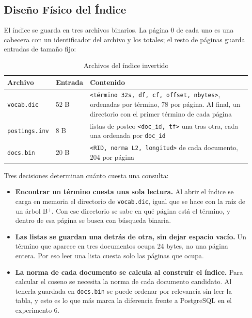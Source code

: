 \documentclass[a4paper,12pt]{article}
\begin{document}
\subsection{Diseño Físico del Índice}

El índice se guarda en tres archivos binarios. La página 0 de cada uno es una
cabecera con un identificador del archivo y los totales; el resto de páginas
guarda entradas de tamaño fijo:

\begin{table}[H]
\centering
\caption{Archivos del índice invertido}
\begin{tabularx}{\textwidth}{@{}llX@{}}
\toprule
\textbf{Archivo} & \textbf{Entrada} & \textbf{Contenido} \\
\midrule
\texttt{vocab.dic} & 52 B & \texttt{<término 32s, df, cf, offset, nbytes>}, ordenadas por
término, 78 por página. Al final, un directorio con el primer término de cada página \\
\texttt{postings.inv} & 8 B & listas de posteo \texttt{<doc\_id, tf>} una tras otra,
cada una ordenada por \texttt{doc\_id} \\
\texttt{docs.bin} & 20 B & \texttt{<RID, norma L2, longitud>} de cada documento,
204 por página \\
\bottomrule
\end{tabularx}
\end{table}

Tres decisiones determinan cuánto cuesta una consulta:

\begin{itemize}
    \item \textbf{Encontrar un término cuesta una sola lectura.} Al abrir el
    índice se carga en memoria el directorio de \texttt{vocab.dic}, igual que se
    hace con la raíz de un árbol B$^+$. Con ese directorio se sabe en qué página
    está el término, y dentro de esa página se busca con búsqueda binaria.
    \item \textbf{Las listas se guardan una detrás de otra, sin dejar espacio
    vacío.} Un término que aparece en tres documentos ocupa 24 bytes, no una
    página entera. Por eso leer una lista cuesta solo las páginas que ocupa.
    \item \textbf{La norma de cada documento se calcula al construir el índice.}
    Para calcular el coseno se necesita la norma de cada documento candidato. Al
    tenerla guardada en \texttt{docs.bin} se puede ordenar por relevancia sin
    leer la tabla, y esto es lo que más marca la diferencia frente a PostgreSQL
    en el experimento 6.
\end{itemize}
\end{document}
